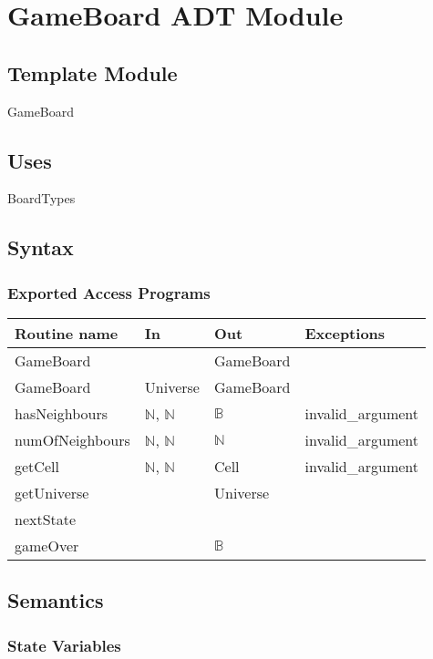 \documentclass[12pt]{article}
\begin{document}
\newpage

\section* {GameBoard ADT Module}

\subsection*{Template Module}

GameBoard

\subsection* {Uses}

BoardTypes

\subsection* {Syntax}

\subsubsection* {Exported Access Programs}

\begin{tabular}{| l | l | l | l |}
\hline
\textbf{Routine name} & \textbf{In} & \textbf{Out} & \textbf{Exceptions}\\
\hline
GameBoard  &  & GameBoard & \\
\hline
GameBoard & Universe & GameBoard & \\
\hline
hasNeighbours & $\mathbb{N}$, $\mathbb{N}$ & $\mathbb{B}$ & invalid\_argument\\
\hline
numOfNeighbours & $\mathbb{N}$, $\mathbb{N}$ & $\mathbb{N}$ & invalid\_argument\\
\hline
getCell & $\mathbb{N}$, $\mathbb{N}$ & Cell & invalid\_argument\\
\hline
getUniverse & & Universe & \\
\hline
nextState &  & & \\
\hline
gameOver & & $\mathbb{B}$ & \\
\hline
\end{tabular}

\subsection* {Semantics}

\subsubsection* {State Variables}
\end{document}
